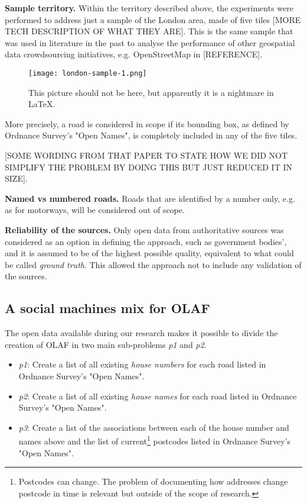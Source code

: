     \textbf{Sample territory.} Within the territory described above, the experiments were performed to address just a sample of the London area, made of five tiles [MORE TECH DESCRIPTION OF WHAT THEY ARE]. This is the same sample that was used in literature in the past to analyse the performance of other geospatial data crowdsourcing initiatives, e.g. OpenStreetMap in [REFERENCE].
    
    \begin{figure*}
    	\texttt{[image: london-sample-1.png]}
    	\caption{This picture should not be here, but apparently it is a nightmare in LaTeX.}
    	\label{fig:london_sample_1}
    \end{figure*}
    
    More precisely, a road is considered in scope if its bounding box, as defined by Ordnance Survey's "Open Names", is completely included in any of the five tiles. 
    
    [SOME WORDING FROM THAT PAPER TO STATE HOW WE DID NOT SIMPLIFY THE PROBLEM BY DOING THIS BUT JUST REDUCED IT IN SIZE].
     
    \textbf{Named vs numbered roads.} Roads that are identified by a number only, e.g. as for motorways, will be considered out of scope.
    
    \textbf{Reliability of the sources.} Only open data from authoritative sources was considered as an option in defining the approach, such as government bodies', and it is assumed to be of the highest possible quality, equivalent to what could be called {\it ground truth}. This allowed the approach not to include any validation of the sources.

\subsection{A social machines mix for OLAF}

    The open data available during our research makes it possible to divide the creation of OLAF in two main sub-problems {\it p1} and {\it p2}. 
    
    \begin{itemize}
        \item {\it p1}: Create a list of all existing {\it house numbers} for each road listed in Ordnance Survey's "Open Names".
        \item {\it p2}: Create a list of all existing {\it house names} for each road listed in Ordnance Survey's "Open Names".
        \item {\it p3}: Create a list of the associations between each of the house number and names above and the list of current\footnote{Postcodes can change. The problem of documenting how addresses change postcode in time is relevant but outside of the scope of research.} postcodes listed in Ordnance Survey's "Open Names". 
    \end{itemize}

